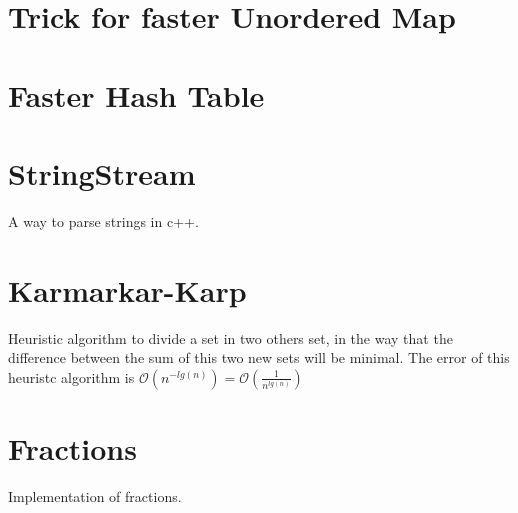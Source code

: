\section{Trick for faster Unordered Map}
        
\section{Faster Hash Table}
    
\section{StringStream}
    A way to parse strings in c++.
    
\section{Karmarkar-Karp}
    Heuristic algorithm to divide a set in two others set, in the way that the difference between the sum of this two new sets will be minimal.
    The error of this heuristc algorithm is $\mathcal{O}(n^{-lg(n)})=\mathcal{O}(\frac{1}{n^{lg(n)}})$
    
\section{Fractions}
    \tab Implementation of fractions.
    